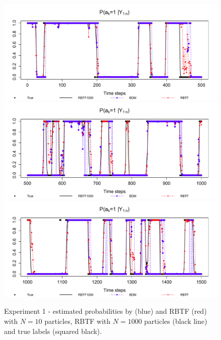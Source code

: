 \begin{figure}
\centering
\includegraphics[scale=.5]{N10_1_500}
\includegraphics[scale=.5]{N10_501_1000}
\includegraphics[scale=.5]{N10_1001_1500}
\caption{Experiment 1 - estimated probabilities by \cite{briers:doucet:maskell:2010} (blue) and RBTF (red) with $N=10$ particles,  RBTF with $N=1000$ particles (black line) and true labels (squared black).}
\label{fig:exp1:label}
\end{figure}

